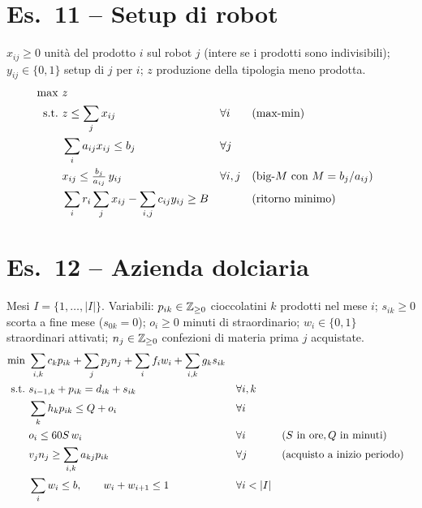 \section*{Es.\ 11 -- Setup di robot}
$x_{ij}\ge0$ unità del prodotto $i$ sul robot $j$ (intere se i prodotti sono indivisibili); $y_{ij}\in\{0,1\}$ setup di $j$ per $i$; $z$ produzione della tipologia meno prodotta.
\begin{align*}
\max\ & z\\
\text{s.t.}\ & z\le\sum_jx_{ij} && \forall i &&\text{(max-min)}\\
& \sum_ia_{ij}x_{ij}\le b_j && \forall j\\
& x_{ij}\le \tfrac{b_j}{a_{ij}}\,y_{ij} && \forall i,j &&\text{(big-$M$ con $M=b_j/a_{ij}$)}\\
& \sum_ir_i\sum_jx_{ij}-\sum_{i,j}c_{ij}y_{ij}\ge B &&&&\text{(ritorno minimo)}
\end{align*}

\section*{Es.\ 12 -- Azienda dolciaria}
Mesi $I=\{1,\dots,|I|\}$. Variabili: $p_{ik}\in\mathbb{Z}_{\ge0}$ cioccolatini $k$ prodotti nel mese $i$; $s_{ik}\ge0$ scorta a fine mese ($s_{0k}=0$); $o_i\ge0$ minuti di straordinario; $w_i\in\{0,1\}$ straordinari attivati; $n_j\in\mathbb{Z}_{\ge0}$ confezioni di materia prima $j$ acquistate.
\begin{align*}
\min\ & \sum_{i,k}c_kp_{ik}+\sum_jp_jn_j+\sum_if_iw_i+\sum_{i,k}g_ks_{ik}\\
\st\ & s_{i-1,k}+p_{ik}=d_{ik}+s_{ik} && \forall i,k\\
& \sum_kh_kp_{ik}\le Q+o_i && \forall i\\
& o_i\le 60S\,w_i && \forall i &&(S\text{ in ore}, Q\text{ in minuti})\\
& v_jn_j\ge\sum_{i,k}a_{kj}p_{ik} && \forall j &&\text{(acquisto a inizio periodo)}\\
& \sum_iw_i\le b,\qquad w_i+w_{i+1}\le1 && \forall i<|I|
\end{align*}

